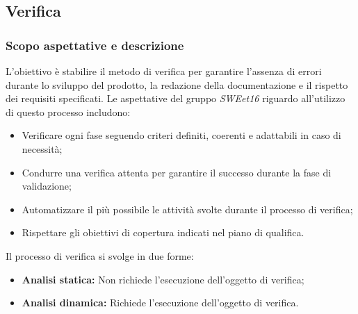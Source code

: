 \pagebreak
\subsection{Verifica}
\subsubsection{Scopo aspettative e descrizione}
L'obiettivo è stabilire il metodo di verifica per garantire l'assenza
di errori durante lo sviluppo del prodotto, la redazione della documentazione
e il rispetto dei requisiti specificati.
Le aspettative del gruppo \emph{SWEet16} riguardo all'utilizzo di questo processo includono:
\begin{itemize}
    \item Verificare ogni fase seguendo criteri definiti, coerenti e adattabili in caso di necessità;
    \item Condurre una verifica attenta per garantire il successo durante la fase di validazione;
    \item Automatizzare il più possibile le attività svolte durante il processo di verifica;
    \item Rispettare gli obiettivi di copertura indicati nel piano di qualifica.
\end{itemize}
Il processo di verifica si svolge in due forme:
\begin{itemize}
    \item \textbf{Analisi statica:} Non richiede l'esecuzione dell'oggetto di verifica;
    \item \textbf{Analisi dinamica:} Richiede l'esecuzione dell'oggetto di verifica.
\end{itemize}
